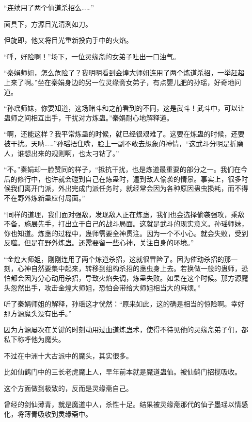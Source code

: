 
\begin{this_body}

“连续用了两个仙道杀招么……”

面具下，方源目光清洌如刀。

但旋即，他又将目光重新投向手中的火焰。

“呼，好险啊！”场下，一位灵缘斋的女弟子吐出一口浊气。

“秦娟师姐，怎么危险了？我明明看到金煌大师姐连用了两个炼道杀招，一举赶超上来了啊。”坐在秦娟身边的另一位灵缘斋女弟子，有点婴儿肥的孙瑶，好奇地问道。

“孙瑶师妹，你要知道，这场赌斗和之前看到的不同，这是武斗！武斗中，可以让蛊师之间相互出手，干扰对方炼蛊。”秦娟耐心地解释道。

“啊，还能这样？我平常炼蛊的时候，就已经很艰难了。这要在炼蛊的时候，还要被干扰。天呐……”孙瑶捂住嘴，脸上一副不敢去想象的神情，“这武斗分明是折磨人，谁想出来的规则啊，也太刁钻了。”

“不。”秦娟却一脸赞同的样子，“抵抗干扰，也是炼道最重要的部分之一。我们在今后的修行中，也许就会碰到自己在炼蛊时，遭到敌人偷袭的情景。事实上，很多时候我们离开门派，外出完成门派任务时，就经常会因为各种原因蛊虫损耗，而不得不在野外炼新蛊应付局面。”

“同样的道理，我们面对强敌，发现敌人正在炼蛊，我们也会选择偷袭强攻，乘敌不备，施展先手，打出立于自己的战斗局面。这就是武斗的现实意义。孙瑶师妹，你也知道。炼蛊的过程中，蛊师需要全神贯注。因为一个不小心。就会失败，受到反噬。但是在野外炼蛊。还需要留一些心神，关注自身的环境。”

“金煌大师姐，刚刚连用了两个炼道杀招，这就很冒险了。因为催动杀招的那一刻，心神自然要集中起来，转移到组构杀招的蛊虫身上去。若换做一般的蛊师，恐怕都会因为分心动用杀招，导致火焰失调，炼蛊失败。如果在这个时候。那方源魔头忽然出手，攻击金煌大师姐，恐怕会带给大师姐相当大的麻烦。”

听了秦娟师姐的解释，孙瑶这才恍然：“原来如此，这的确是相当的惊险啊。幸好那方源魔头没有出手。”

因为方源屡次在关键的时刻动用过血道炼蛊术，使得不待见他的灵缘斋弟子们，都私下称呼他为魔头。

不过在中洲十大古派中的魔头，其实很多。

比如仙鹤门中的三长老虎魔上人，早年前本就是魔道蛊仙。被仙鹤门招揽吸收。

这个方面做到极致的，反而是灵缘斋自己。

曾经的剑仙薄青，就是魔道中人，杀性十足。结果被灵缘斋那代的仙子墨瑶以情感化，将薄青吸收到灵缘斋中。


\end{this_body}

